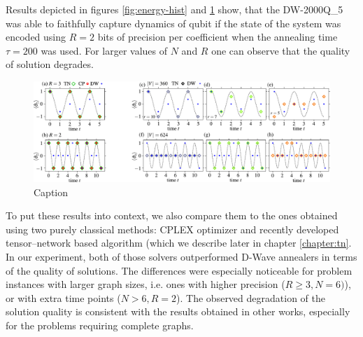 Results depicted in figures \ref{fig:energy-hist} and \ref{fig:cplex_tn_dwave} show, that the DW-2000Q\_{5} was able to faithfully capture dynamics of qubit if the state of the system was encoded using $R=2$ bits of precision per coefficient when the annealing time $\tau=200$ was used. For larger values of $N$ and $R$ one can observe that the quality of solution degrades.

\begin{figure}
	\centering
	\includegraphics[width=\textwidth]{figures/fig34_merge.pdf}
	\caption{Caption}
	\label{fig:cplex_tn_dwave}
\end{figure}

To put these results into context, we also compare them to the ones obtained using two purely
classical methods: CPLEX optimizer and recently developed tensor--network based algorithm (which we
describe later in chapter \ref{chapter:tn}. In our experiment, both of those solvers outperformed
D-Wave annealers in terms of the quality of solutions. The differences were especially noticeable
for problem instances with larger graph sizes, i.e. ones with higher precision ($R \ge 3, N=6)$), or
with extra time points ($N > 6, R = 2$). The observed degradation of the solution quality is
consistent with the results obtained in other works, especially for the problems requiring
complete graphs.


